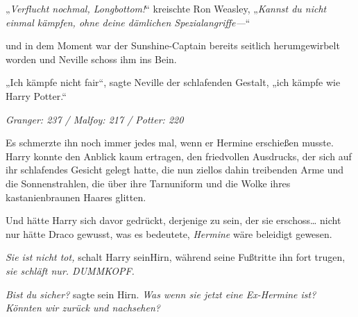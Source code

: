 „\emph{Verflucht nochmal, Longbottom!}“ kreischte Ron Weasley, „\emph{Kannst du nicht einmal kämpfen, ohne deine dämlichen Spezialangriffe—}“

und in dem Moment war der Sunshine-Captain bereits seitlich herumgewirbelt worden und Neville schoss ihm ins Bein.

„Ich kämpfe nicht fair“, sagte Neville der schlafenden Gestalt, „ich kämpfe wie Harry Potter.“

\later

\emph{Granger: 237 / Malfoy: 217 / Potter: 220}

Es schmerzte ihn noch immer jedes mal, wenn er Hermine erschießen musste. Harry konnte den Anblick kaum ertragen, den friedvollen Ausdrucks, der sich auf ihr schlafendes Gesicht gelegt hatte, die nun ziellos dahin treibenden Arme und die Sonnenstrahlen, die über ihre Tarnuniform und die Wolke ihres kastanienbraunen Haares glitten.

Und hätte Harry sich davor gedrückt, derjenige zu sein, der sie erschoss… nicht nur hätte Draco gewusst, was es bedeutete, \emph{Hermine} wäre beleidigt gewesen.

\emph{Sie ist nicht tot,} schalt Harry seinHirn, während seine Fußtritte ihn fort trugen, \emph{sie schläft nur. DUMMKOPF.}

\emph{Bist du sicher?} sagte sein Hirn. \emph{Was wenn sie jetzt eine Ex-Hermine ist? Könnten wir zurück und nachsehen?}%

